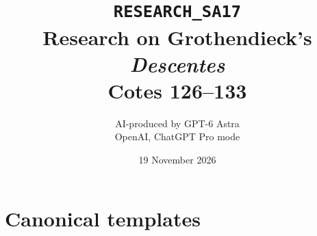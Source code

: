 \documentclass[11pt,a4paper]{article}
\title{\texttt{RESEARCH\_SA17}\\Research on Grothendieck's \emph{Descentes}\\Cotes 126--133}
\author{AI-produced by GPT-6 Astra\\OpenAI, ChatGPT Pro mode}
\date{19 November 2026}
\numberwithin{equation}{section}
\theoremstyle{definition}
\theoremstyle{remark}
\begin{document}
\section{Canonical templates}



\end{document}
